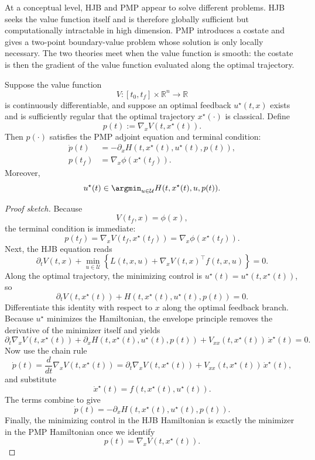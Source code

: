 \begin{remark}
	At a conceptual level, HJB and PMP appear to solve different problems. HJB seeks the value function itself and is therefore globally sufficient but computationally intractable in high dimension. PMP introduces a costate and gives a two-point boundary-value problem whose solution is only locally necessary. The two theories meet when the value function is smooth: the costate is then the gradient of the value function evaluated along the optimal trajectory.
\end{remark}

\begin{theorem}\label{thm:l4-costate-equals-gradient-of-the-value-function}
	Suppose the value function
	\[
		V:[t_0,t_f]\times \mathbb{R}^{n}\to \mathbb{R}
	\]
	is continuously differentiable, and suppose an optimal feedback $u^\star(t,x)$ exists and is sufficiently regular that the optimal trajectory $x^\star(\cdot)$ is classical. Define
	\[
		p(t):=\nabla_x V(t,x^\star(t)).
	\]
	Then $p(\cdot)$ satisfies the PMP adjoint equation and terminal condition:
	\begin{align*}
		\dot p(t) & = -\partial_x H(t,x^\star(t),u^\star(t),p(t)), \\
		p(t_f) & = \nabla_x \phi(x^\star(t_f)).
	\end{align*}
	Moreover,
	\[
		u^\star(t)\in \argmin_{u \in \mathcal{U}} H(t,x^\star(t),u,p(t)).
	\]
\end{theorem}
\begin{proof}[Proof sketch]
	Because
	\[
		V(t_f,x)=\phi(x),
	\]
	the terminal condition is immediate:
	\[
		p(t_f)=\nabla_x V(t_f,x^\star(t_f))=\nabla_x \phi(x^\star(t_f)).
	\]
	Next, the HJB equation reads
	\[
		\partial_t V(t,x)
		+
		\min_{u \in \mathcal{U}}
		\left\{
			L(t,x,u)+\nabla_x V(t,x)^\top f(t,x,u)
		\right\}
		=0.
	\]
	Along the optimal trajectory, the minimizing control is $u^\star(t)=u^\star(t,x^\star(t))$, so
	\[
		\partial_t V(t,x^\star(t))
		+
		H(t,x^\star(t),u^\star(t),p(t))
		=0.
	\]
	Differentiate this identity with respect to $x$ along the optimal feedback branch. Because $u^\star$ minimizes the Hamiltonian, the envelope principle removes the derivative of the minimizer itself and yields
	\[
		\partial_t \nabla_x V(t,x^\star(t))
		+
		\partial_x H(t,x^\star(t),u^\star(t),p(t))
		+
		V_{xx}(t,x^\star(t))\,\dot x^\star(t)
		=0.
	\]
	Now use the chain rule
	\[
		\dot p(t)
		=
		\frac{d}{dt}\nabla_x V(t,x^\star(t))
		=
		\partial_t \nabla_x V(t,x^\star(t))
		+
		V_{xx}(t,x^\star(t))\,\dot x^\star(t),
	\]
	and substitute
	\[
		\dot x^\star(t)=f(t,x^\star(t),u^\star(t)).
	\]
	The terms combine to give
	\[
		\dot p(t)=-\partial_x H(t,x^\star(t),u^\star(t),p(t)).
	\]
	Finally, the minimizing control in the HJB Hamiltonian is exactly the minimizer in the PMP Hamiltonian once we identify
	\[
		p(t)=\nabla_x V(t,x^\star(t)).
	\]
\end{proof}

